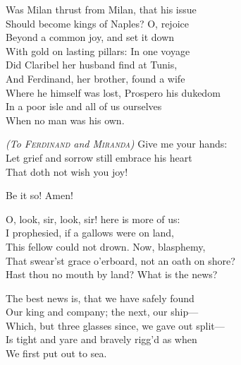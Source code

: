 
\begin{verse_speech}[Gonzalo] 
Was Milan thrust from Milan, that his issue\\
Should become kings of Naples? O, rejoice\\
Beyond a common joy, and set it down\\
With gold on lasting pillars: In one voyage\\
Did Claribel her husband find at Tunis,\\
And Ferdinand, her brother, found a wife\\
Where he himself was lost, Prospero his dukedom\\
In a poor isle and all of us ourselves\\
When no man was his own.
\end{verse_speech}

\begin{verse_speech}[Alonso] 
\textit{(To \textsc{Ferdinand} and \textsc{Miranda})} Give me your hands:\\
Let grief and sorrow still embrace his heart\\
That doth not wish you joy!
\end{verse_speech}

\begin{verse_speech}[Gonzalo]
Be it so! Amen!
	
	
O, look, sir, look, sir! here is more of us:\\
I prophesied, if a gallows were on land,\\
This fellow could not drown. Now, blasphemy,\\
That swear'st grace o'erboard, not an oath on shore?\\
Hast thou no mouth by land? What is the news?
\end{verse_speech}

\begin{verse_speech}[Boatswain] 
The best news is, that we have safely found\\
Our king and company; the next, our ship—\\
Which, but three glasses since, we gave out split—\\
Is tight and yare and bravely rigg'd as when\\
We first put out to sea.
\end{verse_speech}

